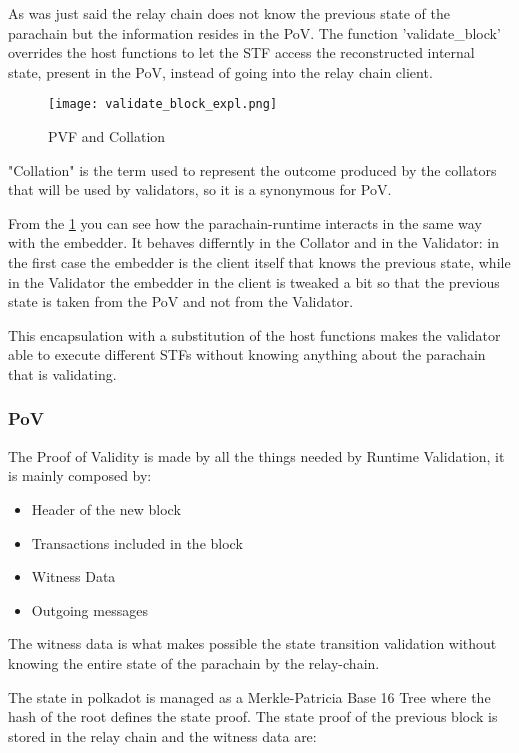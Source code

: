 \documentclass[../main.tex]{subfiles}
\begin{document}
As was just said the relay chain does not know the previous state of the parachain but the information resides in the PoV. The function 'validate\_block' overrides the host functions to let the STF access the reconstructed internal state, present in the PoV, instead of going into the relay chain client.

\begin{figure}[h]
  \centering
  \texttt{[image: validate\_block\_expl.png]}
  \caption{PVF and Collation}
  \label{fig:pvf_pov}
\end{figure}

"Collation" is the term used to represent the outcome produced by the collators that will be used by validators, so it is a synonymous for PoV.


From the \ref{fig:pvf_pov} you can see how the parachain-runtime interacts in the same way with the embedder. It behaves differntly  in the Collator and in the Validator: in the first case the embedder is the client itself that knows the previous state, while  in the Validator the embedder in the client is tweaked a bit so that the previous state is taken from the PoV and not from the Validator.

This encapsulation with a substitution of the host functions makes  the validator able to execute different STFs without knowing anything about the parachain that is validating.

\subsubsection{PoV}

The Proof of Validity is made by all the things needed by Runtime Validation, it is mainly composed by:~\cite{cumulus-docs}

\begin{itemize}
  \item Header of the new block
  \item Transactions included in the block
  \item Witness Data
  \item Outgoing messages
\end{itemize}

The witness data is what makes possible the state transition validation without knowing the entire state of the parachain by the relay-chain.

The state in polkadot is managed as a Merkle-Patricia Base 16 Tree where the hash of the root defines the state proof. The state proof of the previous block is stored in the relay chain and the witness data are:
\end{document}
